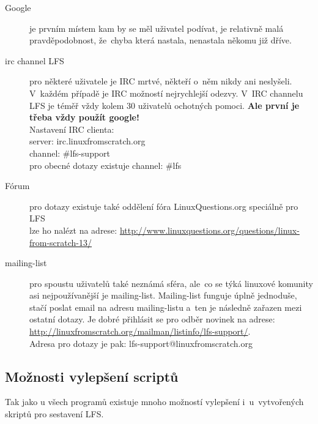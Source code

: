 \documentclass[a4paper,12pt]{article}
\renewcommand{\b}[1]{\textbf{#1}} %
\begin{document}
\begin{description}
 \item[Google] je prvním místem kam by se měl uživatel podívat, je relativně malá pravděpodobnost, že~chyba která nastala, nenastala někomu již dříve.
 \item[irc channel LFS] pro některé uživatele je IRC mrtvé, někteří o~něm nikdy ani neslyšeli. V~každém případě je IRC možností nejrychlejší odezvy. V~IRC channelu LFS je téměř vždy kolem 30 uživatelů ochotných pomoci. \b{Ale první je třeba vždy použít google!}\\
Nastavení IRC clienta:\\
server: irc.linuxfromscratch.org\\
channel: \#lfs-support\\
pro obecné dotazy existuje channel: \#lfs\\
 \item[Fórum] pro dotazy existuje také oddělení fóra LinuxQuestions.org speciálně pro LFS\\
  lze ho nalézt na adrese: \href{http://www.linuxquestions.org/questions/linux-from-scratch-13/}{http://www.linuxquestions.org/questions/linux-from-scratch-13/}
 \item[mailing-list] pro spoustu uživatelů také neznámá sféra, ale~co se týká linuxové komunity asi nejpoužívanější je mailing-list. Mailing-list funguje úplně jednoduše, stačí poslat email na adresu mailing-listu a~ten je následně zařazen mezi ostatní dotazy. Je dobré přihlásit se pro odběr novinek na adrese:\\ \href{http://linuxfromscratch.org/mailman/listinfo/lfs-support/}{http://linuxfromscratch.org/mailman/listinfo/lfs-support/}.\\
Adresa pro dotazy je pak: lfs-support@linuxfromscratch.org
 \end{description}

\subsection{Možnosti vylepšení scriptů}
Tak jako u všech programů existuje mnoho možností vylepšení i~u~vytvořených skriptů pro sestavení LFS.\\
\end{document}
